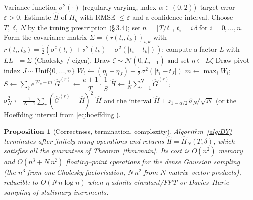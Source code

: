 \documentclass{amsart}
\newtheorem{proposition}{Proposition}
\theoremstyle{definition}
\begin{document}
\begin{algorithm}[h]
\caption{Stable Monte Carlo estimator of the generalized Pickands constant $H_\eta$}
\label{alg:DY}
\begin{algorithmic}[1]
  \Require Variance function $\sigma^2(\cdot)$ (regularly varying, index $\alpha\in(0,2)$);
           target error $\varepsilon>0$.
  \Ensure Estimate $\widehat H$ of $H_\eta$ with RMSE $\le\varepsilon$ and a
           confidence interval.
  \State Choose $T,\ \delta,\ N$ by the tuning prescription
         (\S\,3.4); set $n=\lceil T/\delta\rceil$, $t_i=i\,\delta$ for $i=0,\dots,n$.
  \State Form the covariance matrix $\Sigma=(r(t_i,t_k))_{i,k}$ with
         $r(t_i,t_k)=\tfrac12(\sigma^2(t_i)+\sigma^2(t_k)-\sigma^2(|t_i-t_k|))$;
         compute a factor $L$ with $LL^\top=\Sigma$ (Cholesky / eigen).
     \State Draw $\zeta\sim\mathcal N(0,I_{n+1})$ and set $\eta\gets L\zeta$
     \State Draw pivot index $J\sim\mathrm{Unif}\{0,\dots,n\}$
        \State $W_i \gets (\eta_i-\eta_J)-\tfrac12\,\sigma^2(|t_i-t_J|)$
     \EndFor
     \State $m\gets\max_i W_i$;\quad
            $S\gets\sum_{k} e^{\,W_k-m}$
     \State $\widehat G^{(r)}\gets \dfrac{n+1}{T}\cdot\dfrac{1}{S}$
            \Comment{$=\frac{n+1}{T}\,\frac{\max_i e^{W_i}}{\sum_k e^{W_k}}\in(0,\frac{n+1}{T}]$}
  \EndFor
  \State $\widehat H\gets\frac1N\sum_{r=1}^N\widehat G^{(r)}$;\quad
         $\widehat\sigma_N^2\gets\frac1{N-1}\sum_{r}(\widehat G^{(r)}-\widehat H)^2$
  \State \Return $\widehat H$ and the interval
         $\widehat H\pm z_{1-\alpha/2}\,\widehat\sigma_N/\sqrt N$
         \big(or the Hoeffding interval from \eqref{eq:hoeffding}\big).
\end{algorithmic}
\end{algorithm}

\begin{proposition}[Correctness, termination, complexity]\label{prop:alg}
Algorithm~\ref{alg:DY} terminates after finitely many operations and returns
$\widehat H=\widehat H_N(T,\delta)$, which satisfies all the guarantees of
Theorem~\ref{thm:main}. Its cost is $O(n^2)$ memory and
$O(n^3+N\,n^2)$ floating--point operations for the dense Gaussian sampling
(the $n^3$ from one Cholesky factorisation, $N\,n^2$ from $N$ matrix--vector
products), reducible to $O(N\,n\log n)$ when $\eta$ admits circulant/FFT or
Davies--Harte sampling of stationary increments.
\end{proposition}
\end{document}
